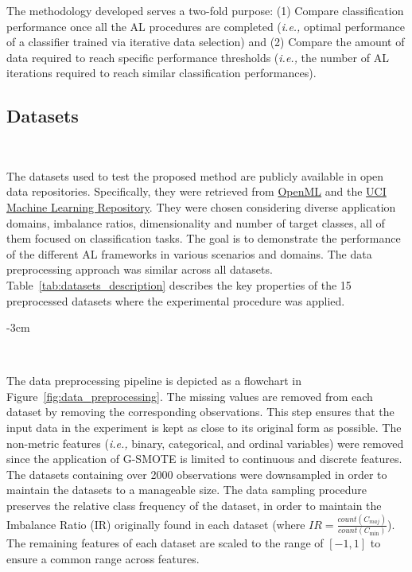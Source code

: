 The methodology developed serves a two-fold purpose: (1) Compare classification
performance once all the AL procedures are completed (\textit{i.e.,} optimal
performance of a classifier trained via iterative data selection) and (2)
Compare the amount of data required to reach specific performance thresholds
(\textit{i.e.,} the number of AL iterations required to reach similar
classification performances).
 
\subsection{Datasets}~\label{sec:datasets-al-aug}

The datasets used to test the proposed method are publicly available in open
data repositories. Specifically, they were retrieved from
\href{https://www.openml.org/}{OpenML} and the
\href{https://archive.ics.uci.edu/}{UCI Machine Learning Repository}. They
were chosen considering diverse application domains, imbalance ratios,
dimensionality and number of target classes, all of them focused on
classification tasks. The goal is to demonstrate the performance of the
different AL frameworks in various scenarios and domains. The data
preprocessing approach was similar across all datasets.
Table~\ref{tab:datasets_description} describes the key properties of the
15 preprocessed datasets where the experimental procedure was applied. 
 
\begin{table}
    \centering
    \addtolength{\leftskip} {-3cm}
    \addtolength{\rightskip}{-3cm}
    \caption[Description of the datasets collected after data
        preprocessing.]{%
        Description of the datasets collected after data preprocessing. The
        sampling strategy is similar across datasets. Legend: (IR) Imbalance
        Ratio
    }~\label{tab:datasets_description}
\end{table}

The data preprocessing pipeline is depicted as a flowchart in
Figure~\ref{fig:data_preprocessing}. The missing values are removed from each
dataset by removing the corresponding observations. This step ensures
that the input data in the experiment is kept as close to its original form as
possible. The non-metric features (\textit{i.e.,} binary, categorical,
and ordinal variables) were removed since the application of G-SMOTE is
limited to continuous and discrete features. The datasets containing over 2000
observations were downsampled in order to maintain the datasets to a
manageable size. The data sampling procedure preserves the relative class
frequency of the dataset, in order to maintain the Imbalance Ratio (IR)
originally found in each dataset (where $IR =
\frac{count(C_{maj})}{count(C_{\min})}$). The remaining features of each
dataset are scaled to the range of $[-1, 1]$ to ensure a common range across
features.

